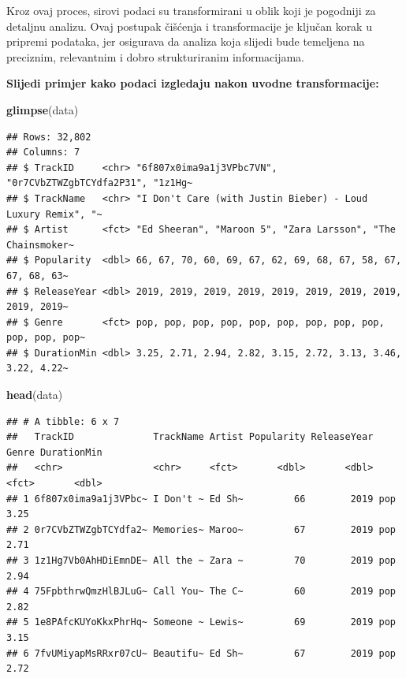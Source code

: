 \documentclass[
]{article}
\newenvironment{Shaded}{\begin{snugshade}}{\end{snugshade}}
\newcommand{\FunctionTok}[1]{\textcolor[rgb]{0.13,0.29,0.53}{\textbf{#1}}}
\newcommand{\NormalTok}[1]{#1}
\begin{document}
Kroz ovaj proces, sirovi podaci su transformirani u oblik koji je
pogodniji za detaljnu analizu. Ovaj postupak čišćenja i transformacije
je ključan korak u pripremi podataka, jer osigurava da analiza koja
slijedi bude temeljena na preciznim, relevantnim i dobro strukturiranim
informacijama.

\textbf{Slijedi primjer kako podaci izgledaju nakon uvodne
transformacije:}

\begin{Shaded}
\begin{Highlighting}[]
\FunctionTok{glimpse}\NormalTok{(data)}
\end{Highlighting}
\end{Shaded}

\begin{verbatim}
## Rows: 32,802
## Columns: 7
## $ TrackID     <chr> "6f807x0ima9a1j3VPbc7VN", "0r7CVbZTWZgbTCYdfa2P31", "1z1Hg~
## $ TrackName   <chr> "I Don't Care (with Justin Bieber) - Loud Luxury Remix", "~
## $ Artist      <fct> "Ed Sheeran", "Maroon 5", "Zara Larsson", "The Chainsmoker~
## $ Popularity  <dbl> 66, 67, 70, 60, 69, 67, 62, 69, 68, 67, 58, 67, 67, 68, 63~
## $ ReleaseYear <dbl> 2019, 2019, 2019, 2019, 2019, 2019, 2019, 2019, 2019, 2019~
## $ Genre       <fct> pop, pop, pop, pop, pop, pop, pop, pop, pop, pop, pop, pop~
## $ DurationMin <dbl> 3.25, 2.71, 2.94, 2.82, 3.15, 2.72, 3.13, 3.46, 3.22, 4.22~
\end{verbatim}

\begin{Shaded}
\begin{Highlighting}[]
\FunctionTok{head}\NormalTok{(data)}
\end{Highlighting}
\end{Shaded}

\begin{verbatim}
## # A tibble: 6 x 7
##   TrackID              TrackName Artist Popularity ReleaseYear Genre DurationMin
##   <chr>                <chr>     <fct>       <dbl>       <dbl> <fct>       <dbl>
## 1 6f807x0ima9a1j3VPbc~ I Don't ~ Ed Sh~         66        2019 pop          3.25
## 2 0r7CVbZTWZgbTCYdfa2~ Memories~ Maroo~         67        2019 pop          2.71
## 3 1z1Hg7Vb0AhHDiEmnDE~ All the ~ Zara ~         70        2019 pop          2.94
## 4 75FpbthrwQmzHlBJLuG~ Call You~ The C~         60        2019 pop          2.82
## 5 1e8PAfcKUYoKkxPhrHq~ Someone ~ Lewis~         69        2019 pop          3.15
## 6 7fvUMiyapMsRRxr07cU~ Beautifu~ Ed Sh~         67        2019 pop          2.72
\end{verbatim}
\end{document}
